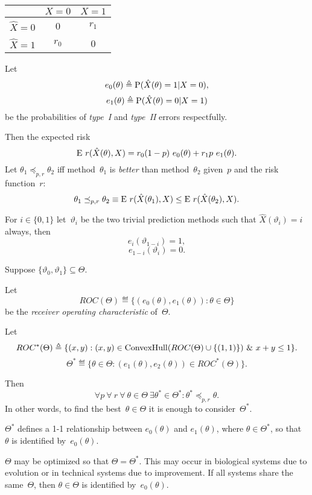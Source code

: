 \documentclass[10pt,a4paper]{article}
\theoremstyle{plain} \newtheorem{Lem}{Lemma}
\begin{document}
\begin{center}
\begin{tabular}{|c||c|c|}
\hline              & $X=0$ & $X=1$ \\
\hline 
\hline $\hat X = 0$ & 0     & $r_1$ \\
\hline $\hat X = 1$ & $r_0$ & 0 \\
\hline
\end{tabular}
\end{center}

Let 
$$e_0(\theta) \triangleq \mathrm P(\hat X(\theta) = 1 | X = 0),$$
$$e_1(\theta) \triangleq \mathrm P(\hat X(\theta) = 0 | X = 1)$$
be the probabilities of {\em type~I} and {\em type~II} errors respectfully. 

Then the expected risk 
\begin{equation} \label{expectedRisk}
\E r(\hat X(\theta), X) = r_0 (1-p) \ e_0(\theta) + r_1 p \ e_1(\theta). 
\end{equation}
Let $\theta_1 \preceq_{p,r} \theta_2$ iff method~$\theta_1$ is {\em better} than method~$\theta_2$ given~$p$ and the risk function~$r$:
$$ \theta_1 \preceq_{p,r} \theta_2 \equiv \mathrm E \  r(\hat X(\theta_1), X) \le \mathrm E \  r(\hat X(\theta_2), X). $$

For $i \in \{0,1\}$ let~$\vartheta_i$ be the two trivial prediction methods such that $\hat X(\vartheta_i) = i$ always,
then
$$ e_i(\vartheta_{1-i}) = 1, $$
$$ e_{1-i}(\vartheta_i) = 0. $$

Suppose $\{\vartheta_0, \vartheta_1\} \subseteq \Theta$.

Let
$$ROC(\Theta) \eqdef \{(e_0(\theta), e_1(\theta)) : \theta \in \Theta\}$$
be the {\em receiver operating characteristic} of~$\Theta$.

Let
$$ ROC^*(\Theta) \triangleq \{(x, y) : (x,y) \in \mathrm {ConvexHull}(ROC(\Theta) \cup \{(1,1)\}) \ \& \  x + y \le 1 \}. $$
$$ \Theta^* \eqdef \{\theta \in \Theta : (e_1(\theta),e_2(\theta)) \in ROC^*(\Theta)\}.
$$

Then 
$$ \forall p \ \forall \ r \ \forall \ \theta \in \Theta \ \exists \theta^* \in \Theta^* : \theta^* \preceq_{p,r} \theta. $$
In other words, to find the best~$\theta \in \Theta$ it is enough to consider~$\Theta^*$.

$\Theta^*$ defines a 1-1 relationship between $e_0(\theta)$ and $e_1(\theta)$, where $\theta \in \Theta^*$,
so that~$\theta$ is identified by~$e_0(\theta)$.

$\Theta$ may be optimized so that $\Theta = \Theta^*$.
This may occur in biological systems due to evolution or in technical systems due to improvement.
If all systems share the same~$\Theta$, then $\theta \in \Theta$ is identified by~$e_0(\theta)$.
\end{document}
